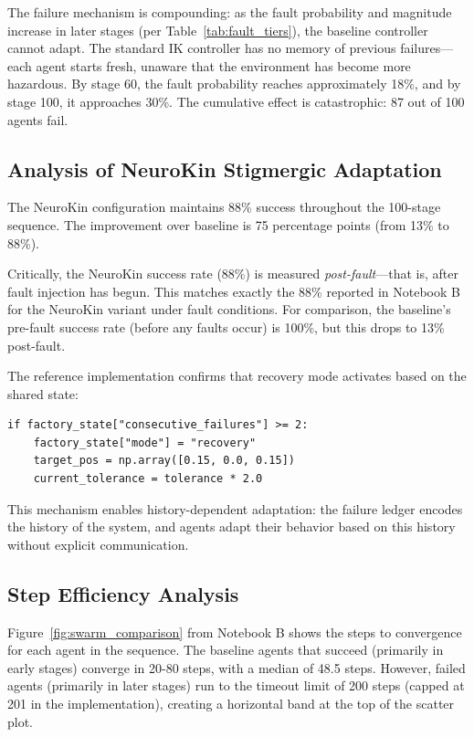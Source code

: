 ﻿\documentclass[12pt,a4paper,oneside]{report}
\begin{document}
The failure mechanism is compounding: as the fault probability and magnitude increase in later stages (per Table~\ref{tab:fault_tiers}), the baseline controller cannot adapt. The standard IK controller has no memory of previous failures---each agent starts fresh, unaware that the environment has become more hazardous. By stage 60, the fault probability reaches approximately 18\%, and by stage 100, it approaches 30\%. The cumulative effect is catastrophic: 87 out of 100 agents fail.

\subsection{Analysis of NeuroKin Stigmergic Adaptation}

The NeuroKin configuration maintains 88\% success throughout the 100-stage sequence. The improvement over baseline is 75 percentage points (from 13\% to 88\%).

Critically, the NeuroKin success rate (88\%) is measured \textit{post-fault}---that is, after fault injection has begun. This matches exactly the 88\% reported in Notebook B for the NeuroKin variant under fault conditions. For comparison, the baseline's pre-fault success rate (before any faults occur) is 100\%, but this drops to 13\% post-fault.

The reference implementation confirms that recovery mode activates based on the shared state:

\begin{verbatim}
if factory_state["consecutive_failures"] >= 2:
    factory_state["mode"] = "recovery"
    target_pos = np.array([0.15, 0.0, 0.15])
    current_tolerance = tolerance * 2.0
\end{verbatim}

This mechanism enables history-dependent adaptation: the failure ledger encodes the history of the system, and agents adapt their behavior based on this history without explicit communication.

\subsection{Step Efficiency Analysis}

Figure~\ref{fig:swarm_comparison} from Notebook B shows the steps to convergence for each agent in the sequence. The baseline agents that succeed (primarily in early stages) converge in 20-80 steps, with a median of 48.5 steps. However, failed agents (primarily in later stages) run to the timeout limit of 200 steps (capped at 201 in the implementation), creating a horizontal band at the top of the scatter plot.
\end{document}
